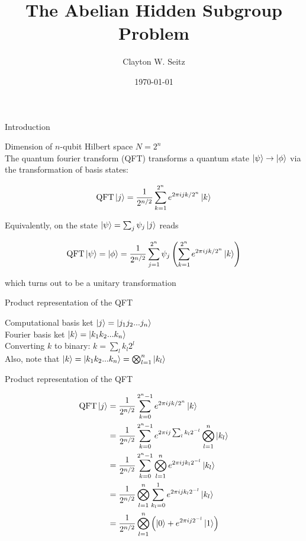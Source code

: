 \documentclass[aspectratio=1610]{beamer}					%
\title{The Abelian Hidden Subgroup Problem}	%
\author{Clayton W. Seitz}								%
\date{\today}									%
\begin{document}
\begin{frame}
  \titlepage
\end{frame}

\begin{frame}{Introduction}

Dimension of $n$-qubit Hilbert space $N=2^{n}$\\
\vspace{0.2in}
The quantum fourier transform (QFT) transforms a quantum state $\ket{\psi}\rightarrow\ket{\phi}$ via the transformation of basis states:

\begin{equation*}
\mathrm{QFT}\ket{j} = \frac{1}{2^{n/2}}\sum_{k=1}^{2^{n}}e^{2\pi ijk/2^{n}}\ket{k}
\end{equation*}

Equivalently, on the state $\ket{\psi}=\sum_{j}\psi_{j}\ket{j}$ reads

\begin{equation*}
\mathrm{QFT}\ket{\psi} = \ket{\phi} = \frac{1}{2^{n/2}}\sum_{j=1}^{2^{n}}\psi_{j}\left(\sum_{k=1}^{2^{n}}e^{2\pi ijk/2^{n}}\ket{k}\right)
\end{equation*}

which turns out to be a unitary transformation

\end{frame}

\begin{frame}{Product representation of the QFT}

Computational basis ket $\ket{j} = \ket{j_{1}j_{2}...j_{n}}$\\
\vspace{0.1in}
Fourier basis ket $\ket{k} = \ket{k_{1}k_{2}...k_{n}}$\\
\vspace{0.1in}
Converting $k$ to binary: $k = \sum_{l}k_{l}2^{l}$ \\
\vspace{0.1in}
Also, note that $\ket{k} = \ket{k_{1}k_{2}...k_{n}} = \bigotimes_{l=1}^{n}\ket{k_{l}}$

\end{frame}

\begin{frame}{Product representation of the QFT}


\begin{align*}
\mathrm{QFT}\ket{j} &= \frac{1}{2^{n/2}}\sum_{k=0}^{2^{n}-1}e^{2\pi ijk/2^{n}}\ket{k}\\
&= \frac{1}{2^{n/2}}\sum_{k=0}^{2^{n}-1}e^{2\pi ij\sum_{l}k_{l}2^{-l}}\bigotimes_{l=1}^{n}\ket{k_{l}}\\
&= \frac{1}{2^{n/2}}\sum_{k=0}^{2^{n}-1}\bigotimes_{l=1}^{n}e^{2\pi ij k_{l}2^{-l}}\ket{k_{l}}\\
&= \frac{1}{2^{n/2}}\bigotimes_{l=1}^{n}\sum_{k_{l}=0}^{1}e^{2\pi ij k_{l}2^{-l}}\ket{k_{l}}\\
&= \frac{1}{2^{n/2}}\bigotimes_{l=1}^{n}\left(\ket{0}+e^{2\pi ij 2^{-l}}\ket{1}\right)\
\end{align*}

\end{frame}
\end{document}
